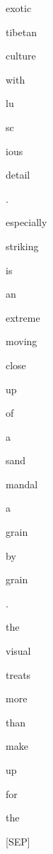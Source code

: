 \documentclass[varwidth=150mm]{standalone}
\begin{document}
\begin{CJK*}{UTF8}{gbsn}
{{{\colorbox{red!7.327168941497803}{\strut exotic} \colorbox{red!56.099403381347656}{\strut tibetan} \colorbox{red!1.8811438083648682}{\strut culture} \colorbox{red!0.0}{\strut with} \colorbox{red!0.0}{\strut lu}\colorbox{red!0.0}{\strut sc}\colorbox{red!0.0}{\strut ious} \colorbox{red!3.6635985374450684}{\strut detail} \colorbox{red!0.0}{\strut .} \colorbox{red!0.0}{\strut especially} \colorbox{red!0.0}{\strut striking} \colorbox{red!0.0}{\strut is} \colorbox{red!1.5356262922286987}{\strut an} \colorbox{red!8.279378890991211}{\strut extreme} \colorbox{red!4.743741989135742}{\strut moving} \colorbox{red!7.785305976867676}{\strut close} \colorbox{red!5.183501720428467}{\strut up} \colorbox{red!3.633579730987549}{\strut of} \colorbox{red!8.509215354919434}{\strut a} \colorbox{red!3.783280849456787}{\strut sand} \colorbox{red!26.45384979248047}{\strut mandal}\colorbox{red!3.147841215133667}{\strut a} \colorbox{red!2.0801382064819336}{\strut grain} \colorbox{red!3.282879590988159}{\strut by} \colorbox{red!37.643280029296875}{\strut grain} \colorbox{red!0.0}{\strut .} \colorbox{red!4.3608808517456055}{\strut the} \colorbox{red!7.520949363708496}{\strut visual} \colorbox{red!3.025890588760376}{\strut treats} \colorbox{red!1.8542263507843018}{\strut more} \colorbox{red!1.129529595375061}{\strut than} \colorbox{red!1.7103137969970703}{\strut make} \colorbox{red!0.0}{\strut up} \colorbox{red!0.0}{\strut for} \colorbox{red!100.0}{\strut the} \colorbox{red!1.6507618427276611}{\strut [SEP]}
}}}
\end{CJK*}
\end{document}
